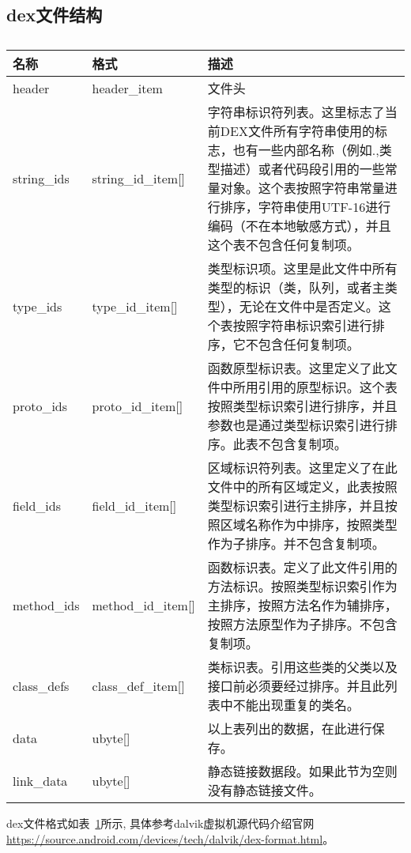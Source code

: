 \subsection{dex文件结构}
\begin{table}[htbp]
\caption{\label{tab:dex}}
\begin{tabular}{|p{1.6cm}|p{2.7cm}|p{8.5cm}|}
\hline
名称 & 格式 & 描述\\
\hline
header & header\_item & 文件头\\
\hline
string\_ids & string\_id\_item[] & 字符串标识符列表。这里标志了当前DEX文件所有字符串使用的标志，也有一些内部名称（例如.,类型描述）或者代码段引用的一些常量对象。这个表按照字符串常量进行排序，字符串使用UTF-16进行编码（不在本地敏感方式），并且这个表不包含任何复制项。\\
\hline
type\_ids & type\_id\_item[] & 类型标识项。这里是此文件中所有类型的标识（类，队列，或者主类型），无论在文件中是否定义。这个表按照字符串标识索引进行排序，它不包含任何复制项。\\
\hline
proto\_ids & proto\_id\_item[] & 函数原型标识表。这里定义了此文件中所用引用的原型标识。这个表按照类型标识索引进行排序，并且参数也是通过类型标识索引进行排序。此表不包含复制项。\\
\hline
field\_ids & field\_id\_item[] & 区域标识符列表。这里定义了在此文件中的所有区域定义，此表按照类型标识索引进行主排序，并且按照区域名称作为中排序，按照类型作为子排序。并不包含复制项。\\
\hline
method\_ids & method\_id\_item[] & 函数标识表。定义了此文件引用的方法标识。按照类型标识索引作为主排序，按照方法名作为辅排序，按照方法原型作为子排序。不包含复制项。\\
\hline
class\_defs & class\_def\_item[] & 类标识表。引用这些类的父类以及接口前必须要经过排序。并且此列表中不能出现重复的类名。\\
\hline
data & ubyte[] & 以上表列出的数据，在此进行保存。\\
\hline
link\_data & ubyte[] & 静态链接数据段。如果此节为空则没有静态链接文件。\\
\hline
\end{tabular}
\end{table}

dex文件格式如表~\ref{tab:dex}所示,
具体参考dalvik虚拟机源代码介绍官网
\url{https://source.android.com/devices/tech/dalvik/dex-format.html}。

